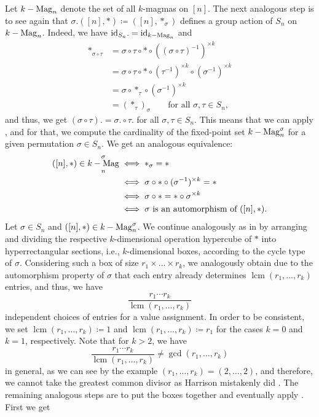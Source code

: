 \documentclass[12pt]{article}
\let\Cref\crtCref
\DeclareMathOperator{\id}{id}
\DeclareMathOperator{\lcm}{lcm}
\DeclareMathOperator{\kMag}{\mathnormal{k}-Mag}
\theoremstyle{definition}
\theoremstyle{remark}
\begin{document}
	Let $\kMag_n$ denote the set of all $k$-magmas on $[n]$. The next analogous step is to see again that $\sigma.([n],\ast) \coloneqq ([n],\ast_{\sigma})$ defines a group action of $S_n$ on $\kMag_n$. Indeed, we have ${\id_{S_n}}. = \id_{\kMag_n}$ and
	\begin{align*}
	\ast_{\sigma\circ\tau}
	&= \sigma\circ\tau\circ\ast\circ((\sigma\circ\tau)^{-1})^{\times k} \\
	&= \sigma\circ\tau\circ\ast\circ(\tau^{-1})^{\times k}\circ(\sigma^{-1})^{\times k}\\
	&= \sigma\circ\ast_{\tau}\circ(\sigma^{-1})^{\times k}\\
	&= {(\ast_{\tau})}_{\sigma} \qquad \text{for all }\sigma,\tau\in S_n,
	\end{align*}
	and thus, we get $(\sigma\circ\tau). = \sigma.\circ\tau.$ for all $\sigma, \tau \in S_n$. This means that we can apply \Cref{lem:orb}, and for that, we compute the cardinality of the fixed-point set $\kMag_n^\sigma$ for a given permutation $\sigma \in S_n$. We get an analogous equivalence:
	\begin{align*}
	([n],\ast) \in \kMag_n^\sigma &\iff \ast_{\sigma} = \ast \\
	&\iff \sigma\circ\ast\circ(\sigma^{-1})^{\times k} = \ast \\
	&\iff \sigma\circ\ast = \ast\circ\sigma^{\times k} \\
	&\iff \sigma \text{ is an automorphism of } ([n],\ast).
	\end{align*}
	Let $\sigma \in S_n$ and $([n],\ast)\in \kMag_n^\sigma$. We continue analogously as in \Cref{sec:pot} by arranging and dividing the respective $k$-dimensional operation hypercube of $\ast$ into hyperrectangular sections, i.e., $k$-dimensional boxes, according to the cycle type of $\sigma$. Considering such a box of size $r_1 \times \dots \times r_k$, we analogously obtain due to the automorphism property of $\sigma$ that each entry already determines $\lcm(r_1,\dots,r_k)$ entries, and thus, we have
	\[
	\frac{r_1\cdots r_k}{\lcm(r_1,\dots,r_k)}
	\]
	independent choices of entries for a value assignment. In order to be consistent, we set $\lcm(r_1,\dots,r_k) \coloneqq 1$ and $\lcm(r_1,\dots,r_k) \coloneqq r_1$ for the cases $k=0$ and $k=1$, respectively. Note that for $k>2$, we have
	\[
	\frac{r_1\cdots r_k}{\lcm(r_1,\dots,r_k)} \ne \gcd(r_1,\dots,r_k)
	\]
	in general, as we can see by the example $(r_1,\dots,r_k) = (2,\dots,2)$, and therefore, we cannot take the greatest common divisor as Harrison mistakenly did \cite[Theorem 5]{H}. The remaining analogous steps are to put the boxes together and eventually apply \Cref{lem:orb}. First we get
\end{document}
